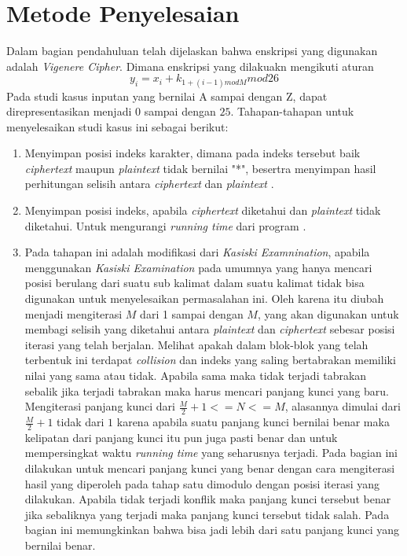 \section{Metode Penyelesaian}
\label{chap:selesai}
Dalam bagian pendahuluan telah dijelaskan bahwa enskripsi yang digunakan adalah \textit{Vigenere Cipher}. Dimana enskripsi yang dilakuakn mengikuti aturan 
\begin{equation}
	y_i=x_i+k_{1+(i-1)mod M} mod 26 
\end{equation}
Pada studi kasus inputan yang bernilai A sampai dengan Z, dapat direpresentasikan menjadi $0$ sampai dengan $25$. 
Tahapan-tahapan untuk menyelesaikan studi kasus ini sebagai berikut:
\begin{enumerate}
\item Menyimpan posisi indeks karakter, dimana pada indeks tersebut baik \textit{ciphertext} maupun \textit{plaintext} tidak bernilai "*", besertra menyimpan hasil perhitungan selisih antara \textit{ciphertext} dan \textit{plaintext}  \cite{john_jones_spoj_2009}.
	\item Menyimpan posisi indeks, apabila \textit{ciphertext} diketahui dan \textit{plaintext} tidak diketahui. Untuk mengurangi \textit{running time} dari program \cite{john_jones_spoj_2009}.
	\item Pada tahapan ini adalah modifikasi dari \textit{Kasiski Examnination}, apabila menggunakan \textit{Kasiski Examination} pada umumnya yang hanya mencari posisi berulang dari suatu sub kalimat dalam suatu kalimat tidak bisa digunakan untuk menyelesaikan permasalahan ini. Oleh karena itu diubah menjadi mengiterasi $M$ dari 1 sampai dengan $M$, yang akan digunakan untuk membagi selisih yang diketahui antara \textit{plaintext} dan \textit{ciphertext} sebesar posisi iterasi yang telah berjalan. Melihat apakah dalam blok-blok yang telah terbentuk ini terdapat \textit{collision} dan indeks yang saling bertabrakan memiliki nilai yang sama atau tidak. Apabila sama maka tidak terjadi tabrakan sebalik jika terjadi tabrakan maka harus mencari panjang kunci yang baru. Mengiterasi panjang kunci dari $\frac{M}{2}+1<=N<=M$, alasannya dimulai dari $\frac{M}{2}+1$ tidak dari $1$ karena apabila suatu panjang kunci bernilai benar maka kelipatan dari panjang kunci itu pun juga pasti benar dan untuk mempersingkat waktu \textit{running time} yang seharusnya terjadi. Pada bagian ini dilakukan untuk mencari panjang kunci yang benar dengan cara mengiterasi hasil yang diperoleh pada tahap satu dimodulo dengan posisi iterasi yang dilakukan. Apabila tidak terjadi konflik maka panjang kunci tersebut benar jika sebaliknya yang terjadi maka panjang kunci tersebut tidak salah. Pada bagian ini memungkinkan bahwa bisa jadi lebih dari satu panjang kunci yang bernilai benar.  

\end{enumerate}
